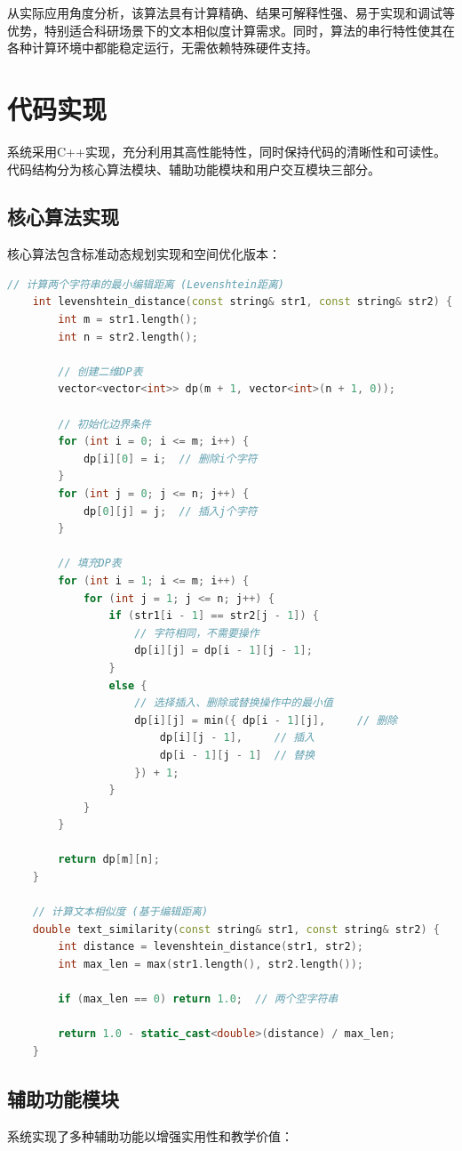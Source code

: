 \documentclass[a4paper]{article}
\begin{document}
从实际应用角度分析，该算法具有计算精确、结果可解释性强、易于实现和调试等优势，特别适合科研场景下的文本相似度计算需求。同时，算法的串行特性使其在各种计算环境中都能稳定运行，无需依赖特殊硬件支持。

\section{代码实现}
系统采用C++实现，充分利用其高性能特性，同时保持代码的清晰性和可读性。代码结构分为核心算法模块、辅助功能模块和用户交互模块三部分。

\subsection{核心算法实现}
核心算法包含标准动态规划实现和空间优化版本：

\begin{lstlisting}[language=C++, caption=最小编辑距离算法实现]
	// 计算两个字符串的最小编辑距离 (Levenshtein距离)
	int levenshtein_distance(const string& str1, const string& str2) {
		int m = str1.length();
		int n = str2.length();
		
		// 创建二维DP表
		vector<vector<int>> dp(m + 1, vector<int>(n + 1, 0));
		
		// 初始化边界条件
		for (int i = 0; i <= m; i++) {
			dp[i][0] = i;  // 删除i个字符
		}
		for (int j = 0; j <= n; j++) {
			dp[0][j] = j;  // 插入j个字符
		}
		
		// 填充DP表
		for (int i = 1; i <= m; i++) {
			for (int j = 1; j <= n; j++) {
				if (str1[i - 1] == str2[j - 1]) {
					// 字符相同，不需要操作
					dp[i][j] = dp[i - 1][j - 1];
				}
				else {
					// 选择插入、删除或替换操作中的最小值
					dp[i][j] = min({ dp[i - 1][j],     // 删除
						dp[i][j - 1],     // 插入
						dp[i - 1][j - 1]  // 替换
					}) + 1;
				}
			}
		}
		
		return dp[m][n];
	}
	
	// 计算文本相似度 (基于编辑距离)
	double text_similarity(const string& str1, const string& str2) {
		int distance = levenshtein_distance(str1, str2);
		int max_len = max(str1.length(), str2.length());
		
		if (max_len == 0) return 1.0;  // 两个空字符串
		
		return 1.0 - static_cast<double>(distance) / max_len;
	}
\end{lstlisting}

\subsection{辅助功能模块}
系统实现了多种辅助功能以增强实用性和教学价值：
\end{document}
